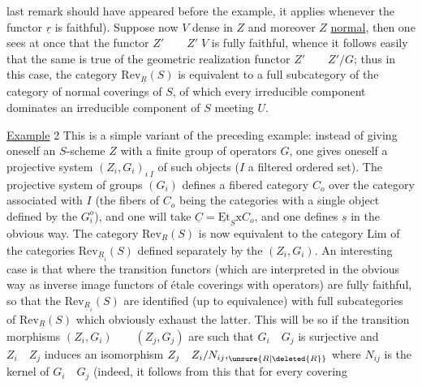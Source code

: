 last remark should have appeared before the example, it applies whenever the functor $\underline{r}$ is faithful).  Suppose now $V$ dense in $Z$ and moreover $Z$ \uline{normal}, then one sees at once that the functor $Z'\qquad Z'\;V$ is fully faithful, whence it follows easily that the same is true of the geometric realization functor $Z'\qquad Z'/G$; thus in this case, the category $\mathrm{Rev}_{\underline{R}}(S)$  is equivalent to a full subcategory of the category of normal coverings  of $S$, of which every irreducible component  dominates an irreducible component of $S$ meeting $U$.

\uline{Example} 2 This is a simple variant of the preceding example: instead of giving oneself an $S$-scheme $Z$ with a finite group of operators $G$, one gives oneself a projective system $(Z_i,G_i)_{i\;I}$ of such objects ($I$ a filtered ordered set).  The projective system of groups $(G_i)$ defines a fibered category $C_o$ over the category associated with $I$ (the fibers of $C_o$ being the categories with a single object defined by the $G_i^o$), and one will take $\underline{C}=\underline{\mathrm{Et}}_S\mathrm{x}C_o$, and one defines $\underline{s}$ in the obvious way. The category $\mathrm{Rev}_{\underline{R}}(S)$ is now equivalent to the category $\mathrm{Lim}$ of the categories $\mathrm{Rev}_{\underline{R}_i}(S)$ defined separately by the $(Z_i,G_i)$. An interesting case is that where the transition functors (which are interpreted in the obvious way as inverse image functors of étale coverings with operators) are fully faithful, so that the $\mathrm{Rev}_{\underline{R}_i}(S)$ are identified (up to equivalence) with full subcategories of $\mathrm{Rev}_{\underline{R}}(S)$ which obviously exhaust the latter. This will be so if the transition morphisms $(Z_i,G_i)\qquad(Z_j,G_j)$ are such that $G_i\quad G_j$ is surjective and $Z_i\quad Z_j$ induces an isomorphism $Z_j\quad Z_i/N_{ij}\mathord{,}_{\unsure{R|\deleted{R}}}$ where $N_{ij}$ is the kernel of $G_i\quad G_j$ (indeed, it follows from this that for every covering 
